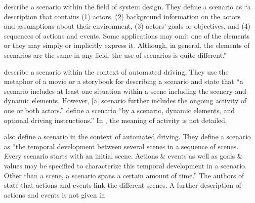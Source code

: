 \textcite{go2004blind} describe a scenario within the field of system design. They define a scenario as ``a description that contains (1) actors, (2) background information on the actors and assumptions about their environment, (3) actors' goals or objectives, and (4) sequences of actions and events. Some applications may omit one of the elements or they may simply or implicitly express it. Although, in general, the elements of scenarios are the same in any field, the use of scenarios is quite different.'' 

\textcite{geyer2014} describe a scenario within the context of automated driving. They use the metaphor of a movie or a storybook for describing a scenario and state that ``a scenario includes at least one situation within a scene including the scenery and dynamic elements. However, [a] scenario further includes the ongoing activity of one or both actors.'' \textcite{geyer2014} define a scenario ``by a scenario, dynamic elements, and optional driving instructions.''
In \autocite{geyer2014}, the meaning of activity is not detailed.

\textcite{ulbrich2015} also define a scenario in the context of automated driving. They define a scenario as ``the temporal development between several scenes in a sequence of scenes. Every scenario starts with an initial scene. Actions \& events as well as goals \& values may be specified to characterize this temporal development in a scenario. Other than a scene, a scenario spans a certain amount of time.'' The authors of \autocite{ulbrich2015} state that actions and events link the different scenes. A further description of actions and events is not given in \autocite{ulbrich2015}


